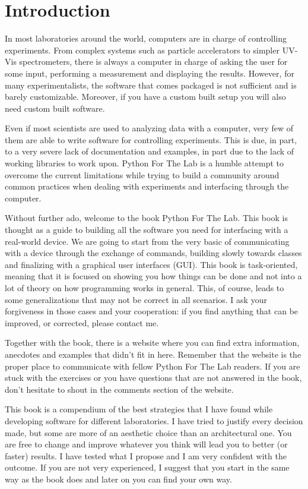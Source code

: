 \chapter{Introduction}
In most laboratories around the world, computers are in charge of controlling experiments. From complex systems such as particle accelerators to simpler UV-Vis spectrometers, there is always a computer in charge of asking the user for some input, performing a measurement and displaying the results. However, for many experimentalists, the software that comes packaged is not sufficient and is barely customizable. Moreover, if you have a custom built setup you will also need custom built software.

Even if most scientists are used to analyzing data with a computer, very few of them are able to write software for controlling experiments. This is due, in part, to a very severe lack of documentation and examples, in part due to the lack of working libraries to work upon. Python For The Lab is a humble attempt to overcome the current limitations while trying to build a community around common practices when dealing with experiments and interfacing through the computer.

Without further ado, welcome to the book Python For The Lab. This book is thought as a guide to building all the software you need for interfacing with a real-world device. We are going to start from the very basic of communicating with a device through the exchange of commands, building slowly towards classes and finalizing with a graphical user interfaces (GUI). This book is task-oriented, meaning that it is focused on showing you how things can be done and not into a lot of theory on how programming works in general. This, of course, leads to some generalizations that may not be correct in all scenarios. I ask your forgiveness in those cases and your cooperation: if you find anything that can be improved, or corrected, please contact me.

Together with the book, there is a website where you can find extra information, anecdotes and examples that didn’t fit in here. Remember that the website is the proper place to communicate with fellow Python For The Lab readers. If you are stuck with the exercises or you have questions that are not answered in the book, don’t hesitate to shout in the comments section of the website.

This book is a compendium of the best strategies that I have found while developing software for different laboratories. I have tried to justify every decision made, but some are more of an aesthetic choice than an architectural one. You are free to change and improve whatever you think will lead you to better (or faster) results. I have tested what I propose and I am very confident with the outcome. If you are not very experienced, I suggest that you start in the same way as the book does and later on you can find your own way.

